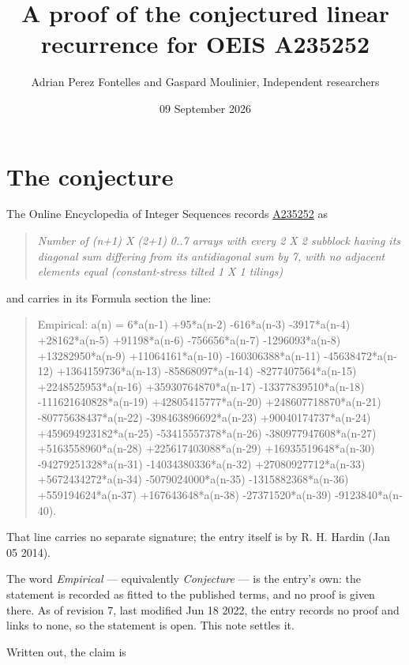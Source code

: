 \documentclass[11pt]{article}
\title{A proof of the conjectured linear recurrence for OEIS A235252}
\author{Adrian Perez Fontelles and Gaspard Moulinier, Independent researchers}
\date{09 September 2026}
\theoremstyle{definition}
\begin{document}
\maketitle
\section{The conjecture}

The Online Encyclopedia of Integer Sequences records \href{https://oeis.org/A235252}{A235252} as

\begin{quote}\itshape Number of (n+1) X (2+1) 0..7 arrays with every 2 X 2 subblock having its diagonal sum differing from its antidiagonal sum by 7, with no adjacent elements equal (constant-stress tilted 1 X 1 tilings)\end{quote}

and carries in its Formula section the line:

\begin{quote}\ttfamily Empirical: a(n) = 6*a(n-1) +95*a(n-2) -616*a(n-3) -3917*a(n-4) +28162*a(n-5) +91198*a(n-6) -756656*a(n-7) -1296093*a(n-8) +13282950*a(n-9) +11064161*a(n-10) -160306388*a(n-11) -45638472*a(n-12) +1364159736*a(n-13) -85868097*a(n-14) -8277407564*a(n-15) +2248525953*a(n-16) +35930764870*a(n-17) -13377839510*a(n-18) -111621640828*a(n-19) +42805415777*a(n-20) +248607718870*a(n-21) -80775638437*a(n-22) -398463896692*a(n-23) +90040174737*a(n-24) +459694923182*a(n-25) -53415557378*a(n-26) -380977947608*a(n-27) +5163558960*a(n-28) +225617403088*a(n-29) +16935519648*a(n-30) -94279251328*a(n-31) -14034380336*a(n-32) +27080927712*a(n-33) +5672434272*a(n-34) -5079024000*a(n-35) -1315882368*a(n-36) +559194624*a(n-37) +167643648*a(n-38) -27371520*a(n-39) -9123840*a(n-40).\end{quote}

That line carries no separate signature; the entry itself is by R. H. Hardin (Jan 05 2014).

The word {\itshape Empirical} --- equivalently {\itshape Conjecture} --- is the entry's own: the statement is recorded as fitted to the published terms, and no proof is given there. As of revision 7, last modified Jun 18 2022, the entry records no proof and links to none, so the statement is open. This note settles it.

Written out, the claim is
\end{document}
